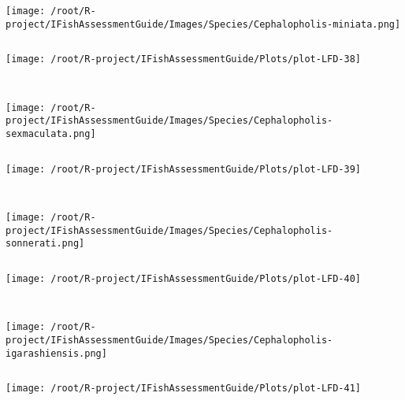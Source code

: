 \documentclass{report}\usepackage[]{graphicx}\usepackage[]{color}
\makeatletter
\def\maxwidth{ %
  \ifdim\Gin@nat@width>\linewidth
    \linewidth
  \else
    \Gin@nat@width
  \fi
}
\newenvironment{kframe}{%
 \def\at@end@of@kframe{}%
 \ifinner\ifhmode%
  \def\at@end@of@kframe{\end{minipage}}%
  \begin{minipage}{\columnwidth}%
 \fi\fi%
 \def\FrameCommand##1{\hskip\@totalleftmargin \hskip-\fboxsep
 \colorbox{shadecolor}{##1}\hskip-\fboxsep
     \hskip-\linewidth \hskip-\@totalleftmargin \hskip\columnwidth}%
 \MakeFramed {\advance\hsize-\width
   \@totalleftmargin\z@ \linewidth\hsize
   \@setminipage}}%
 {\par\unskip\endMakeFramed%
 \at@end@of@kframe}
\newenvironment{knitrout}{}{} %
\makeatother
\begin{document}
\begin{knitrout}
\begin{kframe}
\begin{verbatim}
\end{verbatim}
\end{kframe}
\texttt{[image: /root/R-project/IFishAssessmentGuide/Images/Species/Cephalopholis-miniata.png]}
\begin{kframe}\begin{verbatim}
\end{verbatim}
\end{kframe}
\texttt{[image: /root/R-project/IFishAssessmentGuide/Plots/plot-LFD-38]} 
\begin{kframe}\begin{verbatim}
 
\end{verbatim}
\end{kframe}
\texttt{[image: /root/R-project/IFishAssessmentGuide/Images/Species/Cephalopholis-sexmaculata.png]}
\begin{kframe}\begin{verbatim}
\end{verbatim}
\end{kframe}
\texttt{[image: /root/R-project/IFishAssessmentGuide/Plots/plot-LFD-39]} 
\begin{kframe}\begin{verbatim}
 
\end{verbatim}
\end{kframe}
\texttt{[image: /root/R-project/IFishAssessmentGuide/Images/Species/Cephalopholis-sonnerati.png]}
\begin{kframe}\begin{verbatim}
\end{verbatim}
\end{kframe}
\texttt{[image: /root/R-project/IFishAssessmentGuide/Plots/plot-LFD-40]} 
\begin{kframe}\begin{verbatim}
 
\end{verbatim}
\end{kframe}
\texttt{[image: /root/R-project/IFishAssessmentGuide/Images/Species/Cephalopholis-igarashiensis.png]}
\begin{kframe}\begin{verbatim}
\end{verbatim}
\end{kframe}
\texttt{[image: /root/R-project/IFishAssessmentGuide/Plots/plot-LFD-41]} 
\begin{kframe}\begin{verbatim}
 

\end{verbatim}
\end{kframe}
\end{knitrout}
\end{document}
